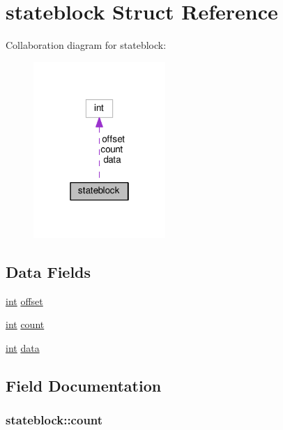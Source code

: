\hypertarget{structstateblock}{}\section{stateblock Struct Reference}
\label{structstateblock}


Collaboration diagram for stateblock\+:
\nopagebreak
\begin{figure}[H]
\begin{center}
\leavevmode
\includegraphics[width=142pt]{structstateblock__coll__graph}
\end{center}
\end{figure}
\subsection*{Data Fields}
\begin{DoxyCompactItemize}
\item 
\hyperlink{pcre_8txt_a42dfa4ff673c82d8efe7144098fbc198}{int} \hyperlink{structstateblock_a2228be0a36fca3a248a81967b90b4e32}{offset}
\item 
\hyperlink{pcre_8txt_a42dfa4ff673c82d8efe7144098fbc198}{int} \hyperlink{structstateblock_ab36f87a6436f1c06eafee5834a79a321}{count}
\item 
\hyperlink{pcre_8txt_a42dfa4ff673c82d8efe7144098fbc198}{int} \hyperlink{structstateblock_aeca60671b6cc7190b41339eb26d11d0d}{data}
\end{DoxyCompactItemize}


\subsection{Field Documentation}
\subsubsection[{\texorpdfstring{count}{count}}]{ stateblock\+::count}\hypertarget{structstateblock_ab36f87a6436f1c06eafee5834a79a321}{}\label{structstateblock_ab36f87a6436f1c06eafee5834a79a321}
